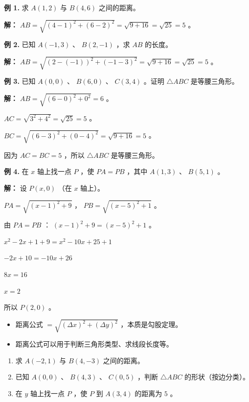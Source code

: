 \begin{workedexamples}


\textbf{例 1.} 求 $A(1, 2)$ 与 $B(4, 6)$ 之间的距离。

\textbf{解：}
$AB = \sqrt{(4-1)^2 + (6-2)^2} = \sqrt{9 + 16} = \sqrt{25} = 5$ 。

\textbf{例 2.} 已知 $A(-1, 3)$ 、 $B(2, -1)$ ，求 $AB$ 的长度。

\textbf{解：}
$AB = \sqrt{(2-(-1))^2 + (-1-3)^2} = \sqrt{9 + 16} = \sqrt{25} = 5$ 。

\textbf{例 3.} 已知 $A(0, 0)$ 、 $B(6, 0)$ 、 $C(3, 4)$ 。证明 $\triangle ABC$ 是等腰三角形。

\textbf{解：}
$AB = \sqrt{(6-0)^2 + 0^2} = 6$ 。

$AC = \sqrt{3^2 + 4^2} = \sqrt{25} = 5$ 。

$BC = \sqrt{(6-3)^2 + (0-4)^2} = \sqrt{9 + 16} = 5$ 。

因为 $AC = BC = 5$ ，所以 $\triangle ABC$ 是等腰三角形。

\textbf{例 4.} 在 $x$ 轴上找一点 $P$ ，使 $PA = PB$ ，其中 $A(1, 3)$ 、 $B(5, 1)$ 。

\textbf{解：}
设 $P(x, 0)$ （在 $x$ 轴上）。

$PA = \sqrt{(x-1)^2 + 9}$ ， $PB = \sqrt{(x-5)^2 + 1}$ 。

由 $PA = PB$ ： $(x-1)^2 + 9 = (x-5)^2 + 1$ 。

$x^2 - 2x + 1 + 9 = x^2 - 10x + 25 + 1$

$-2x + 10 = -10x + 26$

$8x = 16$

$x = 2$

所以 $P(2, 0)$ 。

\end{workedexamples}

\begin{keytakeaway}


\begin{itemize}
  \item 距离公式 $= \sqrt{(\Delta x)^2 + (\Delta y)^2}$ ，本质是勾股定理。
  \item 距离公式可以用于判断三角形类型、求线段长度等。
\end{itemize}


\end{keytakeaway}

\begin{practice}


\begin{enumerate}
  \item 求 $A(-2, 1)$ 与 $B(4, -3)$ 之间的距离。
  \item 已知 $A(0, 0)$ 、 $B(4, 3)$ 、 $C(0, 5)$ ，判断 $\triangle ABC$ 的形状（按边分类）。
  \item 在 $y$ 轴上找一点 $P$ ，使 $P$ 到 $A(3, 4)$ 的距离为 $5$ 。
\end{enumerate}


\end{practice}



